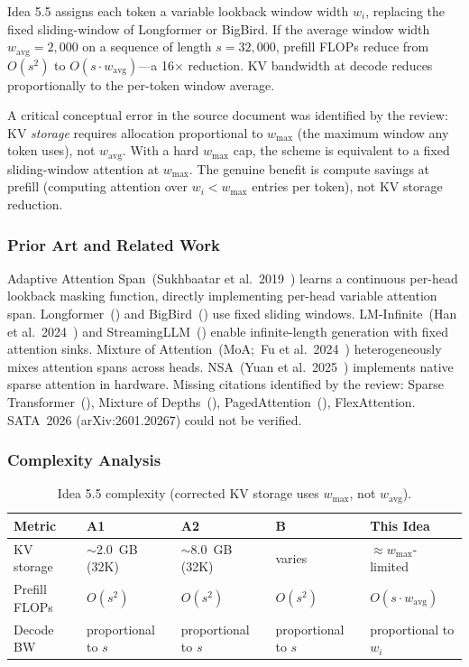 \documentclass[11pt]{article}
\begin{document}
Idea 5.5 assigns each token a variable lookback window width $w_i$, replacing the fixed sliding-window of Longformer or BigBird. If the average window width $w_{\text{avg}}{=}2{,}000$ on a sequence of length $s{=}32{,}000$, prefill FLOPs reduce from $O(s^2)$ to $O(s \cdot w_{\text{avg}})$---a 16$\times$ reduction. KV bandwidth at decode reduces proportionally to the per-token window average.

A critical conceptual error in the source document was identified by the review: KV \emph{storage} requires allocation proportional to $w_{\text{max}}$ (the maximum window any token uses), not $w_{\text{avg}}$. With a hard $w_{\text{max}}$ cap, the scheme is equivalent to a fixed sliding-window attention at $w_{\text{max}}$. The genuine benefit is compute savings at prefill (computing attention over $w_i < w_{\text{max}}$ entries per token), not KV storage reduction. 

\subsubsection*{Prior Art and Related Work}

Adaptive Attention Span~(Sukhbaatar et al.\ 2019~\cite{SukhbaatarAdaptiveSpan2019}) learns a continuous per-head lookback masking function, directly implementing per-head variable attention span. Longformer~(\cite{BeltagyLongformer2020}) and BigBird~(\cite{ZaheerBigBird2020}) use fixed sliding windows. LM-Infinite~(Han et al.\ 2024~\cite{HanLMInfinite2024}) and StreamingLLM~(\cite{XiaoStreamingLLM2023}) enable infinite-length generation with fixed attention sinks. Mixture of Attention~(MoA;~Fu et al.\ 2024~\cite{FuMoA2024}) heterogeneously mixes attention spans across heads. NSA~(Yuan et al.\ 2025~\cite{YuanNSA2025}) implements native sparse attention in hardware. Missing citations identified by the review: Sparse Transformer~(\cite{ChildSparseTransformer2019}), Mixture of Depths~(\cite{RaposoMoD2024}), PagedAttention~(\cite{KwonPagedAttention2023}), FlexAttention. SATA~2026 (arXiv:2601.20267) could not be verified.

\subsubsection*{Complexity Analysis}

\begin{table}[h]
\centering
\caption{Idea 5.5 complexity (corrected KV storage uses $w_\text{max}$, not $w_\text{avg}$).}
\small
\begin{tabular}{lllll}
\toprule
Metric & A1 & A2 & B & This Idea \\
\midrule
KV storage & $\sim$2.0~GB (32K) & $\sim$8.0~GB (32K) & varies & $\approx w_\text{max}$-limited \\
Prefill FLOPs & $O(s^2)$ & $O(s^2)$ & $O(s^2)$ & $O(s \cdot w_\text{avg})$ \\
Decode BW & proportional to $s$ & proportional to $s$ & proportional to $s$ & proportional to $w_i$ \\
\bottomrule
\end{tabular}
\end{table}
\end{document}
